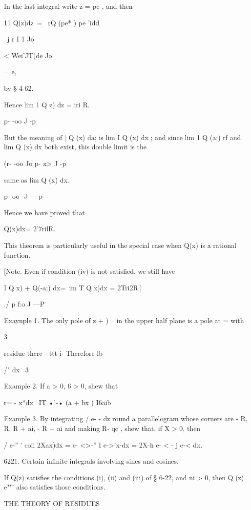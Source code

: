 {In the last integral write z = pe , and then

11 Q(z)dz\ = \ rQ (pe* ) pe 'idd

\ j r I 1 Jo

< Wei'JT)de Jo

= e,

by § 4-62.

Hence lim 1 Q z) dz = iri R.

p- -oo J -p

But the meaning of | Q (x) da; is lim I Q (x) dx ; and since lim 1 Q
(a;) rf and lim Q (x) dx both exist, this double limit is the

(r- -oo Jo p- x> J -p

same as lim Q (x) dx.

p- oo -J — p

Hence we have proved that

Q(x)dx= 2'7rilR.



This theorem is particularly useful in the special case when Q(x) is a
rational function.

[Note. Even if condition (iv) is not satisfied, we still have

I Q x) + Q(-a;) dx=\ im T Q x)dx = 2Tri2R.]

./ p f:o J —P

Exaynple 1. The only pole of z + ) ~ in the upper half plane is a pole
at = with



3

residue there - ttt i- Therefore lb



/" dx \ 3

Example 2. If a > 0, 6 > 0, shew that

r= - x*dx \ IT •'-• (a + bx ) I6aib

Example 3. By integrating / e- - dz round a parallelogram whose
corners are - R, R, R + ai, - R + ai and making R- qc , shew that, if
X > 0, then

/ e-'' ' coii 2Xax)dx = e- <>-'' I e->'x-dx = 2X-h e- < - j e-< dx.

6221. Certain infinite integrals involving sines and cosines.

If Q(z) satisfies the conditions (i), (ii) and (iii) of § 6-22, and ni
> 0, then Q (z) e""' also satisfies those conditions.



THE THEORY OF RESIDUES



}

